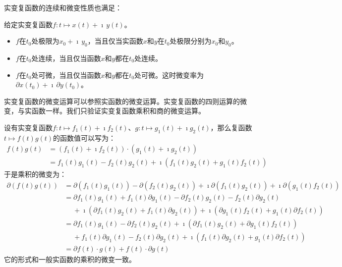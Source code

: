 \documentclass[12pt,UTF8,fontset=none]{ctexbook}
\begin{document}
实变复函数的连续和微变性质也满足：
\begin{tm}\label{tm:1-2-10}
    给定实变复函数$f: t\mapsto x(t) + \imath\, y(t)$。
    \begin{itemize}
        \item $f$在$t_0$处极限为$x_0 + \imath\, y_0$，当且仅当实函数$x$和$y$在$t_0$处极限分别为$x_0$和$y_0$。
        \item $f$在$t_0$处连续，当且仅当函数$x$和$y$都在$t_0$处连续。
        \item $f$在$t_0$处可微，当且仅当函数$x$和$y$都在$t_0$处可微。这时微变率为$\partial x(t_0)+ \imath\,\partial y(t_0)$。
    \end{itemize}
\end{tm}

实变复函数的微变运算可以参照实函数的微变运算。实变复函数的四则运算的微变，与实函数一样。我们只验证实变复函数乘积和商的微变运算。

设有实变复函数$f: t\mapsto f_1(t) + \imath f_2 (t)$、$g: t\mapsto g_1(t) + \imath g_2 (t)$，那么复函数$t\mapsto f(t) g(t)$的函数值可以写为：
\begin{align*}
    f(t) g(t) &= (f_1(t) + \imath f_2 (t))\cdot (g_1(t) + \imath g_2 (t)) \\
    &= f_1(t)g_1(t) - f_2 (t)g_2 (t) + \imath (f_1 (t) g_2 (t) + g_1(t) f_2 (t))
\end{align*}
于是乘积的微变为：
\begin{align*}
    \partial (f(t) g(t)) &= \partial (f_1(t)g_1(t)) - \partial (f_2 (t)g_2 (t)) + \imath \partial (f_1 (t) g_2 (t) ) + \imath \partial (g_1(t) f_2 (t)) \\
    &= \partial f_1(t)g_1(t) + f_1(t) \partial g_1(t) - \partial f_2 (t)g_2 (t) - f_2 (t) \partial g_2 (t) \\ 
    &\;\quad + \imath ( \partial f_1 (t) g_2 (t) + f_1 (t) \partial g_2 (t)) +   \imath (\partial g_1(t) f_2 (t) + g_1(t) \partial f_2 (t)) \\
    &= \partial f_1(t)g_1(t) - \partial f_2 (t)g_2 (t) + \imath ( \partial f_1 (t) g_2 (t) + \partial g_1(t) f_2 (t)) \\
    &\;\quad + f_1(t) \partial g_1(t) - f_2 (t) \partial g_2 (t) + \imath (f_1 (t) \partial g_2 (t) + g_1(t) \partial f_2 (t)) \\
    &= \partial f(t) \cdot g(t) + f(t) \cdot \partial g(t)
\end{align*}
它的形式和一般实函数的乘积的微变一致。
\end{document}
